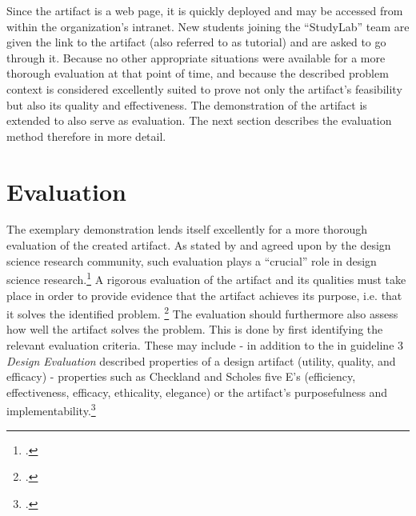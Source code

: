 Since the artifact is a web page, it is quickly deployed and may be accessed from within the organization's intranet. New students joining the \enquote{StudyLab} team are given the link to the artifact (also referred to as tutorial) and are asked to go through it. Because no other appropriate situations were available for a more thorough evaluation at that point of time, and because the described problem context is considered excellently suited to prove not only the artifact's feasibility but also its quality and effectiveness. The demonstration of the artifact is extended to also serve as evaluation. The next section describes the evaluation method therefore in more detail.


\section{Evaluation} \label{sec:Evaluation}

The exemplary demonstration lends itself excellently for a more thorough evaluation of the created artifact. As stated by \cite{HevnerDesignScienceResearch2004} and agreed upon by the design science research community, such evaluation plays a \enquote{crucial} role in design science research.\footcites[Cf.][p.258]{MarchDesignnaturalscience1995}[Cf. in addition][]{PfeffersDesignScienceResearch2007}{HevnerDesignScienceResearch2004}{Pries-HejeComprehensiveFrameworkEvaluation2012}{Pries-HejeStrategiesDesignScience} A rigorous evaluation of the artifact and its qualities must take place in order to provide evidence that the artifact achieves its purpose, i.e. that it solves the identified problem. \footcites[Cf.][p.425]{Pries-HejeComprehensiveFrameworkEvaluation2012} The evaluation should furthermore also assess how well the artifact solves the problem. This is done by first identifying the relevant evaluation criteria. These may include - in addition to the in guideline 3 \textit{Design Evaluation} described properties of a design artifact (utility, quality, and efficacy) - properties such as Checkland and Scholes five E's (efficiency, effectiveness, efficacy, ethicality, elegance) or the artifact's purposefulness and implementability.\footcites[Cf.][p.427]{Pries-HejeComprehensiveFrameworkEvaluation2012}[cf. in addition][]{ChecklandSoftSystemsMethodology1990}

